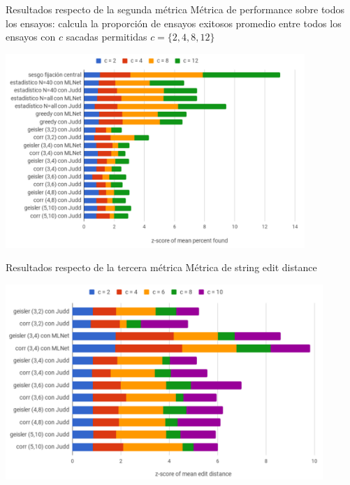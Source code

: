 \documentclass[compress]{beamer}
\begin{document}
\begin{frame}{Resultados respecto de la segunda métrica}
{Métrica de performance sobre todos los ensayos: calcula la proporción de ensayos exitosos promedio entre todos los ensayos con $c$ sacadas permitidas $c = \{2,4,8,12\}$}

\begin{center}
\includegraphics[width=0.85\textwidth]{images/z-score-percent-found.png}
\end{center}

\end{frame}

\begin{frame}{Resultados respecto de la tercera métrica}
{Métrica de string edit distance}

\begin{center}
\includegraphics[width=0.9\textwidth]{images/z-score-mean-edit-distance.png}
\end{center}

\end{frame}
\end{document}
